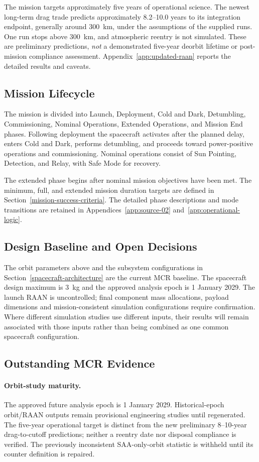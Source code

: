 The mission targets approximately five years of operational science. The newest long-term drag trade predicts approximately 8.2--10.0 years to its integration endpoint, generally around 300~km, under the assumptions of the supplied runs. One run stops above 300~km, and atmospheric reentry is not simulated. These are preliminary predictions, \emph{not} a demonstrated five-year deorbit lifetime or post-mission compliance assessment. Appendix~\ref{app:updated-raan} reports the detailed results and caveats.

\subsection{Mission Lifecycle}\label{sec:mission-lifecycle}
The mission is divided into Launch, Deployment, Cold and Dark, Detumbling, Commissioning, Nominal Operations, Extended Operations, and Mission End phases. Following deployment the spacecraft activates after the planned delay, enters Cold and Dark, performs detumbling, and proceeds toward power-positive operations and commissioning. Nominal operations consist of Sun Pointing, Detection, and Relay, with Safe Mode for recovery.

The extended phase begins after nominal mission objectives have been met. The minimum, full, and extended mission duration targets are defined in Section~\ref{mission-success-criteria}. The detailed phase descriptions and mode transitions are retained in Appendices~\ref{app:source-02} and~\ref{app:operational-logic}.

\subsection{Design Baseline and Open Decisions}\label{sec:design-baseline}
The orbit parameters above and the subsystem configurations in Section~\ref{spacecraft-architecture} are the current MCR baseline. The spacecraft design maximum is 3~kg and the approved analysis epoch is 1 January 2029. The launch RAAN is uncontrolled; final component mass allocations, payload dimensions and mission-consistent simulation configurations require confirmation. Where different simulation studies use different inputs, their results will remain associated with those inputs rather than being combined as one common spacecraft configuration.

\subsection{Outstanding MCR Evidence}
\paragraph{Orbit-study maturity.} The approved future analysis epoch is 1 January 2029. Historical-epoch orbit/RAAN outputs remain provisional engineering studies until regenerated. The five-year operational target is distinct from the new preliminary 8--10-year drag-to-cutoff predictions; neither a reentry date nor disposal compliance is verified. The previously inconsistent SAA-only-orbit statistic is withheld until its counter definition is repaired.
